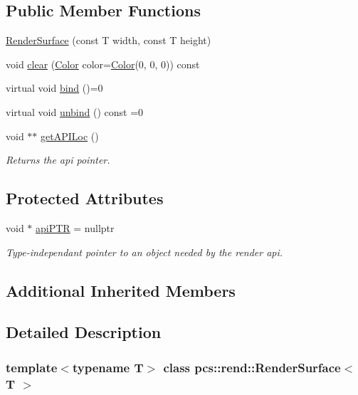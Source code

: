 \subsection*{Public Member Functions}
\begin{DoxyCompactItemize}
\item 
\hyperlink{classpcs_1_1rend_1_1RenderSurface_a908ee596a69b977a74270f03ecc90808}{Render\+Surface} (const T width, const T height)
\item 
void \hyperlink{classpcs_1_1rend_1_1RenderSurface_ac875e478b7cbf438aa541f31fba6b750}{clear} (\hyperlink{structpcs_1_1Color}{Color} color=\hyperlink{structpcs_1_1Color}{Color}(0, 0, 0)) const
\item 
virtual void \hyperlink{classpcs_1_1rend_1_1RenderSurface_a79c0b291ed5a7b901fe4233bf8b376f2}{bind} ()=0
\item 
virtual void \hyperlink{classpcs_1_1rend_1_1RenderSurface_aacb7218feb1973ee4b0486494fcd8c88}{unbind} () const =0
\item 
void $\ast$$\ast$ \hyperlink{classpcs_1_1rend_1_1RenderSurface_a54cbf8c34638a82bfe02bc1f1663a4ab}{get\+A\+P\+I\+Loc} ()
\begin{DoxyCompactList}\small\item\em Returns the api pointer. \end{DoxyCompactList}\end{DoxyCompactItemize}
\subsection*{Protected Attributes}
\begin{DoxyCompactItemize}
\item 
void $\ast$ \hyperlink{classpcs_1_1rend_1_1RenderSurface_ac991c5aaed973108fa4bb97d605f02cc}{api\+P\+TR} = nullptr
\begin{DoxyCompactList}\small\item\em Type-\/independant pointer to an object needed by the render api. \end{DoxyCompactList}\end{DoxyCompactItemize}
\subsection*{Additional Inherited Members}


\subsection{Detailed Description}
\subsubsection*{template$<$typename T$>$\newline
class pcs\+::rend\+::\+Render\+Surface$<$ T $>$}

